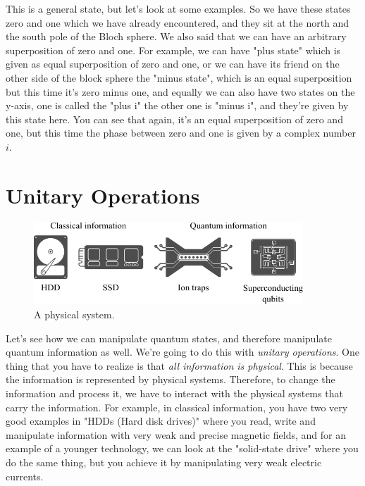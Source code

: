 This is a general state, but let's look at some examples. So we have these states zero and one which we have already encountered, and they sit at the north and the south pole of the Bloch sphere. We also said that we can have an arbitrary superposition of zero and one. For example, we can have "plus state" which is given as equal superposition of zero and one, or we can have its friend on the other side of the block sphere the "minus state", which is an equal superposition but this time it's zero minus one, and equally we can also have two states on the y-axis, one is called the "plus i" the other one is "minus i", and they're given by this state here. You can see that again, it's an equal superposition of zero and one, but this time the phase between zero and one is given by a complex number $i$.

\section{Unitary Operations}


\begin{figure}[H]
    \centering
    \includegraphics[width=0.9\textwidth]{lesson2/2-2_classical_quantum_info.pdf}
        \caption{A physical system.}
    \label{fig:physical-system}
\end{figure}

Let's see how we can manipulate quantum states, and therefore manipulate quantum information as well. We're going to do this with \emph{unitary operations}. One thing that you have to realize is that \emph{all information is physical}. This is because the information is represented by physical systems. Therefore, to change the information and process it, we have to interact with the physical systems that carry the information. For example, in classical information, you have two very good examples in "HDDs (Hard disk drives)" where you read, write and manipulate information with very weak and precise magnetic fields, and for an example of a younger technology, we can look at the "solid-state drive" where you do the same thing, but you achieve it by manipulating very weak electric currents.

